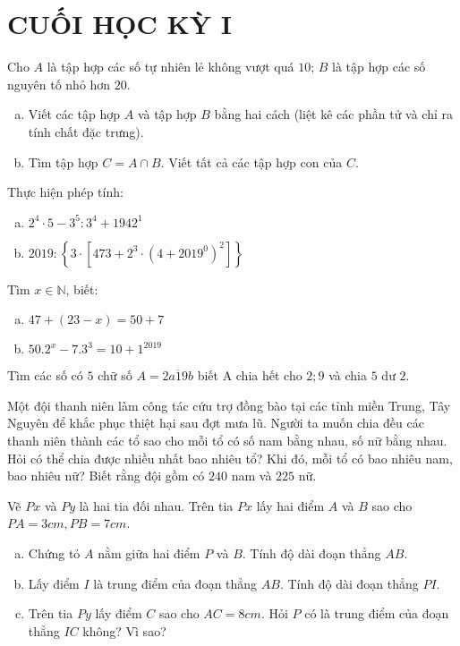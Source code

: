 \section{CUỐI HỌC KỲ I}
\setcounter{ex}{0}
\begin{ex}
Cho $A$ là tập hợp các số tự nhiên lẻ không vượt quá  $10$; $B$ là tập hợp các số nguyên tố nhỏ hơn  $20$.
\begin{enumerate}[a)]
	\item Viết các tập hợp $A$ và tập hợp $B$ bằng hai cách (liệt kê các phần tử và chỉ ra tính chất đặc trưng).
	\item Tìm tập hợp $C=A \cap B$. Viết tất cả các tập hợp con của $C$.
	\end{enumerate}
	\end{ex}
\begin{ex}
	Thực hiện phép tính:
	\begin{enumerate}[a)]
	\item $2^{4} \cdot 5-3^{5}: 3^{4}+1942^{1}$
	\item $2019:\left\{3 \cdot\left[473+2^{3} \cdot\left(4+2019^{0}\right)^{2}\right]\right\}$
	\end{enumerate}
\end{ex}
\begin{ex}
	Tìm $x \in \mathbb{N}$, biết:
\begin{enumerate}[a)]
	\item $47+(23-x)=50+7$
	\item $50.2^{x}-7.3^{3}=10+1^{2019}$
	\end{enumerate}
\end{ex}
\begin{ex}
Tìm các số có $5$ chữ số $A=\overline{2 a 19 b}$ biết A chia hết cho $2; 9$ và chia $5$ dư $2$.
\end{ex}
\begin{ex}
	Một đội thanh niên làm công tác cứu trợ đồng bào tại các tỉnh miền Trung, Tây Nguyên để khắc phục thiệt hại sau đợt mưa lũ. Người ta muốn chia đều các thanh niên thành các tổ sao cho mỗi tổ có số nam bằng nhau, số nữ bằng nhau. Hỏi có thể chia được nhiều nhất bao nhiêu tổ? Khi đó, mỗi tổ có bao nhiêu nam, bao nhiêu nữ? Biết rằng đội gồm có $240$ nam và $225$ nữ.
\end{ex}
\begin{ex}
	Vẽ $Px$ và $Py$ là hai tia đối nhau. Trên tia $Px$ lấy hai điểm $A$ và $B$ sao cho $PA = 3 cm, PB =  7 cm$.
\begin{enumerate}[a)]
	\item Chứng tỏ $A$ nằm giữa hai điểm $P$ và $B$. Tính độ dài đoạn thẳng $AB$.
	\item Lấy điểm $I$ là trung điểm của đoạn thẳng $AB$. Tính độ dài đoạn thẳng $PI$.
	\item Trên tia $Py$ lấy điểm $C$ sao cho $AC = 8cm$. Hỏi $P$ có là trung điểm của đoạn thẳng $IC$ không? Vì sao?
	\end{enumerate}
\end{ex}
